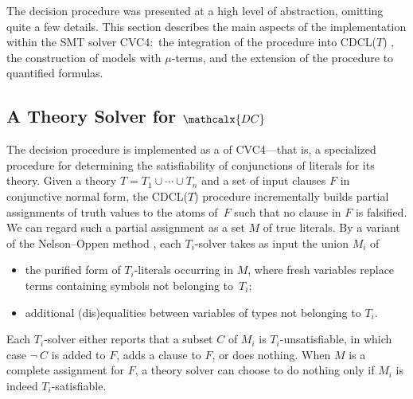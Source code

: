 \documentclass[smallcondensed,draft]{svjour3}
\newcommand{\thD}{\mathcalx{DC}}
\begin{document}
The decision procedure was presented at a high level of abstraction, omitting
quite a few details. This section describes the main aspects of the
implementation within the SMT solver CVC4:\ the integration of the
procedure into CDCL($T$)
\cite{ganzinger-et-al-2004}, the construction of models with $\mu$-terms,
and the extension of the procedure to quantified formulas.

\subsection{A Theory Solver for $\thD$}

The decision procedure is implemented as a  of CVC4---that is, a
specialized procedure for determining the satisfiability of conjunctions of
literals for its theory.
Given a theory $T = T_1 \mathrel\cup \cdots \mathrel\cup T_n$ and a set of
input clauses $F$ in conjunctive normal form, the CDCL($T$) procedure
incrementally builds partial assignments of
truth values to the atoms of~$F$ such that no clause in $F$ is falsified. We can regard such a
partial assignment as a set $M$ of true literals.
By a variant \cite{jovanovic2011sharing}
of the Nelson--Oppen method \cite{nelson-oppen-1979},
each $T_i$-solver %
takes as input the union $M_i$
of
\begin{itemize}
\item the purified form of $T_i$-literals occurring in $M$, where fresh
variables replace terms containing symbols not belonging to~$T_i$;
\item additional (dis)equalities between variables of types not belonging to
$T_i$.
\end{itemize}
Each $T_i$-solver
either reports that a subset $C$ of $M_i$ is $T_i$-unsatisfiable, in which case
$\neg\: C$ is added to $F\!$, adds a clause to $F\!$, or does nothing.
When $M$ is a complete assignment for $F\!$, a theory solver can choose to do
nothing only if $M_i$ is indeed $T_i$-satisfiable.
\end{document}
